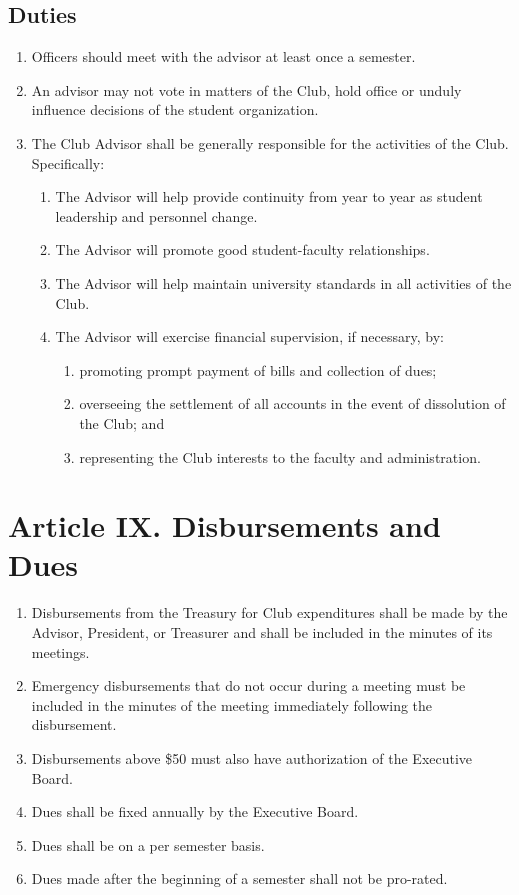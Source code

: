 \documentclass[12pt]{scrartcl} %
\begin{document}
	\subsection{Duties}
		\begin{enumerate}
			\item Officers should meet with the advisor at least once a semester.
			\item An advisor may not vote in matters of the Club, hold office or unduly influence decisions of the student organization.
			\item The Club Advisor shall be generally responsible for the activities of the Club. Specifically:
			\begin{enumerate}			
				\item The Advisor will help provide continuity from year to year as student leadership and personnel change.
				\item The Advisor will promote good student-faculty relationships.
				\item The Advisor will help maintain university standards in all activities of the Club.
				\item The Advisor will exercise financial supervision, if necessary, by:
				\begin{enumerate}
					\item promoting prompt payment of bills and collection of dues;
					\item overseeing the settlement of all accounts in the event of dissolution of the Club; and
					\item representing the Club interests to the faculty and administration.  	
				\end{enumerate}
			\end{enumerate}
		\end{enumerate}
\section{Article IX. Disbursements and Dues}
	\begin{enumerate}
		\item Disbursements from the Treasury for Club expenditures shall be made by the Advisor, President, or Treasurer and shall be included in the minutes of its meetings.
		\item Emergency disbursements that do not occur during a meeting must be included in the minutes of the meeting immediately following the disbursement.
		\item Disbursements above \$50 must also have authorization of the Executive Board.
		\item Dues shall be fixed annually by the Executive Board.
		\item Dues shall be on a per semester basis.
		\item Dues made after the beginning of a semester shall not be pro-rated.  
	\end{enumerate}
\end{document}
